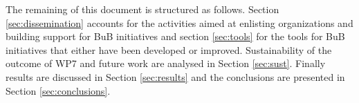 The remaining of this document is structured as follows. Section \ref{sec:dissemination} accounts for the activities aimed at enlisting organizations and building support for BuB initiatives and section \ref{sec:tools} for the tools for BuB initiatives that either have been developed or improved. Sustainability of the outcome of WP7 and future work are analysed in Section \ref{sec:sust}. Finally results are discussed in Section \ref{sec:results} and the conclusions are presented in Section \ref{sec:conclusions}.
